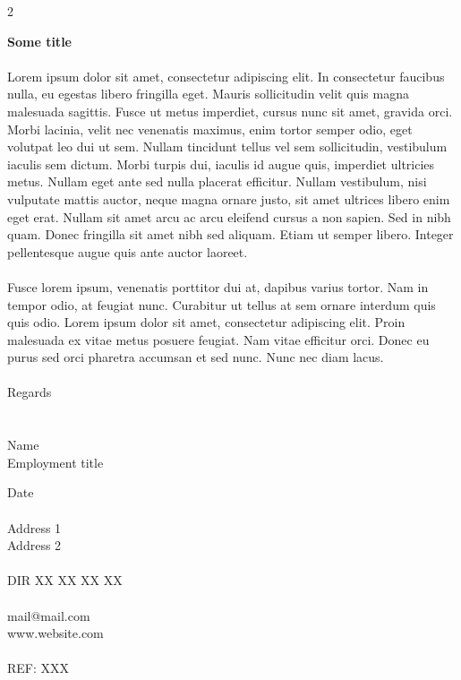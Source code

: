\documentclass[12pt]{article}
\begin{document}
\begin{paracol}{2}
    \begin{tcolorbox}[blanker, breakable, width=\linewidth]

    \textbf{Some title}
    \\
    \\
    Lorem ipsum dolor sit amet, consectetur adipiscing elit. In consectetur faucibus nulla, eu egestas libero fringilla eget. Mauris sollicitudin velit quis magna malesuada sagittis. Fusce ut metus imperdiet, cursus nunc sit amet, gravida orci. Morbi lacinia, velit nec venenatis maximus, enim tortor semper odio, eget volutpat leo dui ut sem. Nullam tincidunt tellus vel sem sollicitudin, vestibulum iaculis sem dictum. Morbi turpis dui, iaculis id augue quis, imperdiet ultricies metus. Nullam eget ante sed nulla placerat efficitur. Nullam vestibulum, nisi vulputate mattis auctor, neque magna ornare justo, sit amet ultrices libero enim eget erat. Nullam sit amet arcu ac arcu eleifend cursus a non sapien. Sed in nibh quam. Donec fringilla sit amet nibh sed aliquam. Etiam ut semper libero. Integer pellentesque augue quis ante auctor laoreet.
    \\
    \\
    Fusce lorem ipsum, venenatis porttitor dui at, dapibus varius tortor. Nam in tempor odio, at feugiat nunc. Curabitur ut tellus at sem ornare interdum quis quis odio. Lorem ipsum dolor sit amet, consectetur adipiscing elit. Proin malesuada ex vitae metus posuere feugiat. Nam vitae efficitur orci. Donec eu purus sed orci pharetra accumsan et sed nunc. Nunc nec diam lacus.
    \\
    \\
    Regards
    \\
    \\
    \\
    Name\\
    Employment title
        
    \end{tcolorbox}
    \switchcolumn
    \begin{tcolorbox}[blanker, breakable, width=\linewidth]
    {\fontsize{8}{14}\selectfont

    Date
    \\ \\
    Address 1 \\
    Address 2
    \\ \\
    DIR XX XX XX XX
    \\ \\
    mail@mail.com \\
    www.website.com
    \\ \\
    REF: XXX

    }
    \end{tcolorbox}
\end{paracol}
\end{document}

